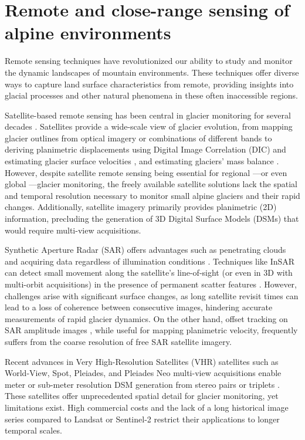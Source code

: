 \section{Remote and close-range sensing of alpine environments}

Remote sensing techniques have revolutionized our ability to study and monitor the dynamic landscapes of mountain environments. 
These techniques offer diverse ways to capture land surface characteristics from remote, providing insights into glacial processes and other natural phenomena in these often inaccessible regions.

Satellite-based remote sensing has been central in glacier monitoring for several decades \citep{Paul2007}. 
Satellites provide a wide-scale view of glacier evolution, from mapping glacier outlines from optical imagery or combinations of different bands \cite{Hall1995, Paul_2002, Winsvold2016} to deriving planimetric displacements using Digital Image Correlation (DIC) and estimating glacier surface velocities \cite{Scambos1992, Kaab2005, Scherler2008, altena_kaab_2020}, and estimating glaciers' mass balance \cite{Bamber2007, Berthier2016, Rabatel2017, Berthier2023}.
However, despite satellite remote sensing being essential for regional —or even global —glacier monitoring, the freely available satellite solutions lack the spatial and temporal resolution necessary to monitor small alpine glaciers and their rapid changes.
Additionally, satellite imagery primarily provides planimetric (2D) information, precluding the generation of 3D Digital Surface Models (DSMs) that would require multi-view acquisitions.

Synthetic Aperture Radar (SAR) offers advantages such as penetrating clouds and acquiring data regardless of illumination conditions \citep{Fang2016, Winsvold2018, Strozzi2020}. 
Techniques like InSAR can detect small movement along the satellite's line-of-sight (or even in 3D with multi-orbit acquisitions) in the presence of permanent scatter features \citep{schubert2013glacier}.
However, challenges arise with significant surface changes, as long satellite revisit times can lead to a loss of coherence between consecutive images, hindering accurate measurements of rapid glacier dynamics.
On the other hand, offset tracking on SAR amplitude images \citep{schellenberger2015sar}, while useful for mapping planimetric velocity, frequently suffers from the coarse resolution of free SAR satellite imagery.

Recent advances in Very High-Resolution Satellites (VHR) satellites such as World-View, Spot, Pleiades, and Pleiades Neo multi-view acquisitions enable meter or sub-meter resolution DSM generation from stereo pairs or triplets \citep{rupnik2018_VHR, Perko218, Tonolo2020}.
These satellites offer unprecedented spatial detail for glacier monitoring, yet limitations exist.
High commercial costs and the lack of a long historical image series compared to Landsat or Sentinel-2 restrict their applications to longer temporal scales.

